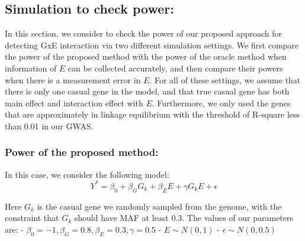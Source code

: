 \documentclass[
]{article}
\begin{document}
\clearpage

\hypertarget{simulation-to-check-power}{%
\subsection{Simulation to check
power:}\label{simulation-to-check-power}}

In this section, we consider to check the power of our proposed approach
for detecting GxE interaction via two different simulation settings. We
first compare the power of the proposed method with the power of the
oracle method when information of \(E\) can be collected accurately, and
then compare their powers when there is a measurement error in \(E\).
For all of these settings, we assume that there is only one casual gene
in the model, and that true casual gene has both main effect and
interaction effect with \(E\). Furthermore, we only used the genes that
are approximately in linkage equilibrium with the threshold of R-square
less than 0.01 in our GWAS.

\hypertarget{power-of-the-proposed-method}{%
\subsubsection{Power of the proposed
method:}\label{power-of-the-proposed-method}}

In this case, we consider the following model:
\[Y^* = \beta_0 + \beta_GG_k + \beta_EE+\gamma G_kE + \epsilon\]

Here \(G_k\) is the casual gene we randomly sampled from the genome,
with the constraint that \(G_k\) should have MAF at least 0.3. The
values of our parameters are: -
\(\beta_0= -1, \beta_G=0.8, \beta_E= 0.3,\gamma=0.5\) -
\(E \sim N(0,1)\) - \(\epsilon \sim N(0,0.5)\)
\end{document}
